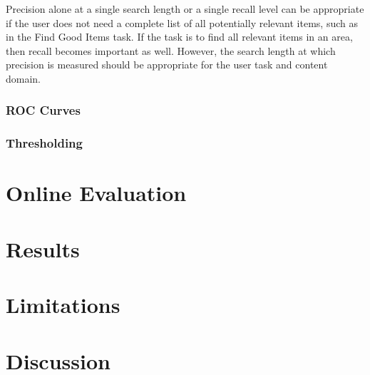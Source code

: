 Precision alone at a single search length or a single recall level can be appropriate
if the user does not need a complete list of all potentially relevant
items, such as in the Find Good Items task. If the task is to find all relevant
items in an area, then recall becomes important as well. However, the search
length at which precision is measured should be appropriate for the user task
and content domain.


\subsubsection{ROC Curves}

\subsubsection{Thresholding}

\section{Online Evaluation}

\section{Results}

\section{Limitations}

\section{Discussion}






